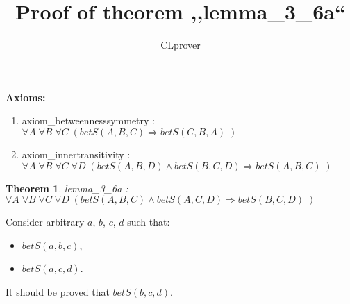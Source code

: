 \documentclass{article}
\newtheorem{theorem}{Theorem}
\begin{document}
\title{Proof of theorem ,,lemma\_3\_6a``}
\author{CLprover}
\maketitle

\noindent 
{\bfseries Axioms:} 
\begin{enumerate}
\item axiom\_betweennesssymmetry : $\forall A \; \forall B \; \forall C \; ( betS(A, B, C) \Rightarrow betS(C, B, A)\;)$
\item axiom\_innertransitivity : $\forall A \; \forall B \; \forall C \; \forall D \; ( betS(A, B, D)\wedge betS(B, C, D) \Rightarrow betS(A, B, C)\;)$
\end{enumerate}

\hrulefill

\begin{theorem}
lemma\_3\_6a : $\forall A \; \forall B \; \forall C \; \forall D \; ( betS(A, B, C)\wedge betS(A, C, D) \Rightarrow betS(B, C, D)\;)$
\end{theorem}

\setcounter{proofstepnum}{0}

\vspace{5pt}

\noindent Consider arbitrary $a$, $b$, $c$, $d$ such that: \begin{itemize} 

\item  $betS(a, b, c)$, 
\item  $betS(a, c, d)$. 
\end{itemize} 
It should be proved that $betS(b, c, d)$.
\vspace{5pt}


\vspace{5pt}
\noindent

% 
\end{document}
